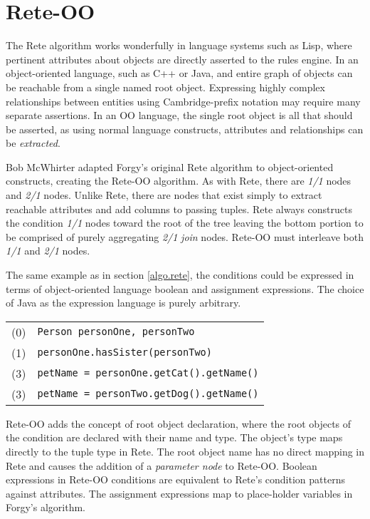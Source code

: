 \section{Rete-OO}

The Rete algorithm works wonderfully in language systems 
such as Lisp, where pertinent attributes about objects 
are directly asserted to the rules engine.  In an
object-oriented language, such as C++ or Java, and entire 
graph of objects can be reachable from a single named 
root object.  Expressing highly complex relationships between
entities using Cambridge-prefix notation may require many
separate assertions.  In an OO language, the single root
object is all that should be asserted, as using normal
language constructs, attributes and relationships can be
\emph{extracted}.

Bob McWhirter adapted Forgy's original Rete algorithm to 
object-oriented constructs, creating the Rete-OO algorithm.
As with Rete, there are \emph{1/1} nodes and \emph{2/1}
nodes.  Unlike Rete, there are nodes that exist simply 
to extract reachable attributes and add columns to passing
tuples. Rete always constructs the condition \emph{1/1} nodes toward
the root of the tree leaving the bottom portion to be 
comprised of purely aggregating \emph{2/1} \emph{join} nodes.  
Rete-OO must interleave both \emph{1/1} and \emph{2/1} nodes.

The same example as in section \ref{algo.rete}, 
the conditions could be expressed in terms of object-oriented
language boolean and assignment expressions.  The choice
of Java as the expression language is purely arbitrary.

\medskip

\begin{tabular}{cl}
(0) & \texttt{Person personOne, personTwo} \\
(1) & \texttt{personOne.hasSister(personTwo)} \\
(3) & \texttt{petName = personOne.getCat().getName()} \\
(3) & \texttt{petName = personTwo.getDog().getName()} \\
\end{tabular}

\bigskip

Rete-OO adds the concept of root object declaration, where 
the root objects of the condition are declared with their
name and type.  The object's type maps directly to the
tuple type in Rete.  The root object name has no direct
mapping in Rete and causes the addition of a \emph{parameter node}
to Rete-OO.  Boolean expressions in Rete-OO conditions are
equivalent to Rete's condition patterns against attributes.
The assignment expressions map to place-holder variables in
Forgy's algorithm.

